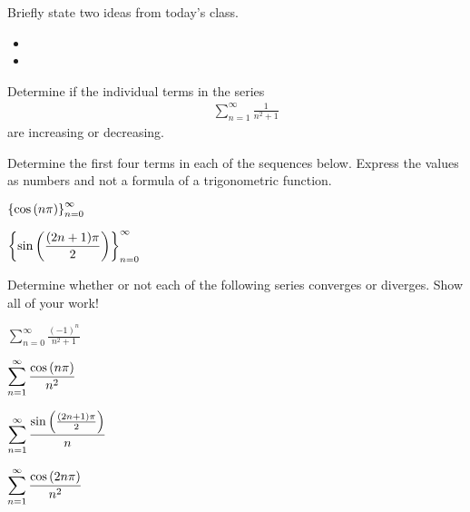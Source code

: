 \postClass

\begin{problem}
\item Briefly state two ideas from today's class.
  \begin{itemize}
  \item
  \item
  \end{itemize}
\item
  \begin{subproblem}
    \item
  \end{subproblem}
\end{problem}



\begin{problem}
\item Determine if the individual terms in the series
  \begin{eqnarray*}
    & & \sum^\infty_{n=1} \frac{1}{n^2+1}
  \end{eqnarray*}
  are increasing or decreasing.

    \vfill


  \item  Determine the first four terms in each of the sequences below. Express the values as numbers and not a formula of a trigonometric function.
    \begin{subproblem}
      \item $\displaystyle \left\{ \cos\left( n\pi \right)\right\}_{n=0}^\infty$
        \vfill
      \item $\displaystyle \left\{ \sin\left( \frac{(2n+1)\pi}{2}\right)\right\}_{n=0}^\infty$
        \vfill
    \end{subproblem}
\end{problem}


\begin{problem}
\item Determine whether or not each of the following series converges
  or diverges. Show all of your work!
  \begin{subproblem}
    \item $\displaystyle \sum_{n=0}^\infty \frac{(-1)^n}{n^2+1}$
      \vfill
    \item $\displaystyle \sum_{n=1}^\infty \frac{\cos\left( n\pi \right)}{n^2}$
      \vfill
      \clearpage
    \item $\displaystyle \sum_{n=1}^\infty \frac{\sin\left(\frac{(2n+1)\pi}{2}\right)}{n} $
      \vfill
    \item $\displaystyle \sum_{n=1}^\infty \frac{\cos\left( 2n\pi \right)}{n^2}$
      \vfill
  \end{subproblem}
\end{problem}


